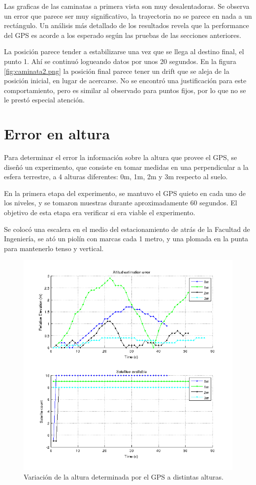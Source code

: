 \documentclass[spanish,12pt,a4paper,titlepage]{report}
\begin{document}
Las graficas de las caminatas a primera vista son muy desalentadoras. Se observa un error que parece ser muy significativo, la trayectoria no se parece en nada a un rectángulo. Un análisis más detallado de los resultados revela que la performance del GPS es acorde a los esperado según las pruebas de las secciones anteriores.

La posición parece tender a estabilizarse una vez que se llega al destino final, el punto 1. Ahí se continuó logueando datos por unos 20 segundos. En la figura \ref{fig:caminata2.png} la posición final parece tener un drift que se aleja de la posición inicial, en lugar de acercarse. No se encontró una justificación para este comportamiento, pero es similar al observado para puntos fijos, por lo que no se le prestó especial atención.

\newpage
\section{Error en altura}
\label{sec:error-en-altura}

Para determinar el error la información sobre la altura que provee el GPS, se diseñó un experimento, que consiste en tomar medidas en una perpendicular a la esfera terrestre, a 4 alturas diferentes: 0m, 1m, 2m y 3m respecto al suelo.

En la primera etapa del experimento, se mantuvo el GPS quieto en cada uno de los niveles, y se tomaron muestras durante aproximadamente 60 segundos. El objetivo de esta etapa era verificar si era viable el experimento.

Se colocó una escalera en el medio del estacionamiento de atrás de la Facultad de Ingeniería, se ató un piolín con marcas cada 1 metro, y una plomada en la punta para mantenerlo tenso y vertical.

\begin{figure}[h!]
  \begin{center}
  \includegraphics[width=.7\textwidth]{./img/altura_punto_fijo_fing.png}
  \end{center}
  \caption{Variación de la altura determinada por el GPS a distintas alturas.}
  \label{fig:altura_punto_fijo_fing.png}
\end{figure}
\end{document}
